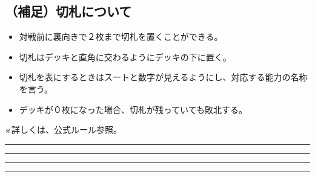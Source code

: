 \documentclass[twocolumn,a5paper,papersize,10pt]{jarticle}
\begin{document}
\subsection*{（補足）切札について}
\vspace{-1zh}%
\begin{itemize}
\setlength{\leftskip}{-0.3cm}%
\setlength{\parskip}{0pt}      %

\item 対戦前に裏向きで２枚まで切札を置くことができる。
\item 切札はデッキと直角に交わるようにデッキの下に置く。
\item 切札を表にするときはスートと数字が見えるようにし、対応する能力の名称を言う。
\item デッキが０枚になった場合、切札が残っていても敗北する。
\end{itemize}
※詳しくは、公式ルール参照。
\vspace{-1zh}%

\begin{center}
\begin{center}
\hrule height 1mm depth 0mm width 66.5mm %
\vspace{1mm}%
{\Large\bf {}}
\vspace{1mm}%
\hrule height 0.5mm depth 0mm width 66.5mm %
\end{center}
\end{center}
\vspace{-1zh}%


\begin{center}
\begin{center}
\hrule height 1mm depth 0mm width 66.5mm %
\vspace{1mm}%
{\Large\bf {}}
\vspace{1mm}%
\hrule height 0.5mm depth 0mm width 66.5mm %
\end{center}
\end{center}
\vspace{-2zh}%
\end{document}
